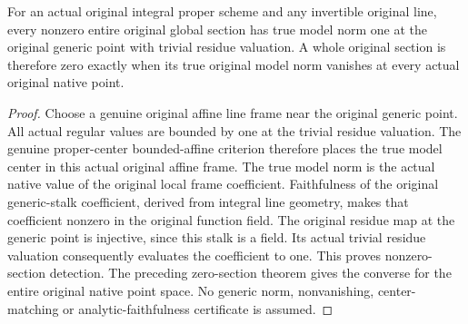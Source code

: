 \begin{theorem}
\label{thm:scheme-original-global-section-norm-detection}
\leanok
{}
For an actual original integral proper scheme and any invertible original line,
every nonzero entire original global section has true model norm one at the
original generic point with trivial residue valuation. A whole original section
is therefore zero exactly when its true original model norm vanishes at every
actual original native point.
\end{theorem}
\begin{proof}
Choose a genuine original affine line frame near the original generic point.
All actual regular values are bounded by one at the trivial residue valuation.
The genuine proper-center bounded-affine criterion therefore places the true
model center in this actual original affine frame. The true model norm is the
actual native value of the original local frame coefficient. Faithfulness of
the original generic-stalk coefficient, derived from integral line geometry,
makes that coefficient nonzero in the original function field. The original
residue map at the generic point is injective, since this stalk is a field.
Its actual trivial residue valuation consequently evaluates the coefficient to
one. This proves nonzero-section detection. The preceding zero-section theorem
gives the converse for the entire original native point space. No generic norm,
nonvanishing, center-matching or analytic-faithfulness certificate is assumed.
\end{proof}
